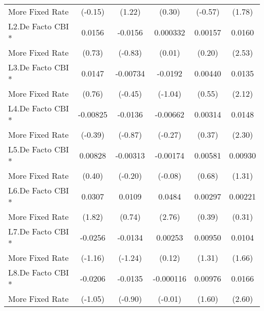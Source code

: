 {\begin{tabular}{l*{5}{c}}
More Fixed Rate     &     (-0.15)         &      (1.22)         &      (0.30)         &     (-0.57)         &      (1.78)         \\
[1em]
L2.De Facto CBI *   &      0.0156         &     -0.0156         &    0.000332         &     0.00157         &      0.0160\sym{*}  \\
More Fixed Rate     &      (0.73)         &     (-0.83)         &      (0.01)         &      (0.20)         &      (2.53)         \\
[1em]
L3.De Facto CBI *   &      0.0147         &    -0.00734         &     -0.0192         &     0.00440         &      0.0135\sym{*}  \\
More Fixed Rate     &      (0.76)         &     (-0.45)         &     (-1.04)         &      (0.55)         &      (2.12)         \\
[1em]
L4.De Facto CBI *   &    -0.00825         &     -0.0136         &    -0.00662         &     0.00314         &      0.0148\sym{*}  \\
More Fixed Rate     &     (-0.39)         &     (-0.87)         &     (-0.27)         &      (0.37)         &      (2.30)         \\
[1em]
L5.De Facto CBI *   &     0.00828         &    -0.00313         &    -0.00174         &     0.00581         &     0.00930         \\
More Fixed Rate     &      (0.40)         &     (-0.20)         &     (-0.08)         &      (0.68)         &      (1.31)         \\
[1em]
L6.De Facto CBI *   &      0.0307         &      0.0109         &      0.0484\sym{**} &     0.00297         &     0.00221         \\
More Fixed Rate     &      (1.82)         &      (0.74)         &      (2.76)         &      (0.39)         &      (0.31)         \\
[1em]
L7.De Facto CBI *   &     -0.0256         &     -0.0134         &     0.00253         &     0.00950         &      0.0104         \\
More Fixed Rate     &     (-1.16)         &     (-1.24)         &      (0.12)         &      (1.31)         &      (1.66)         \\
[1em]
L8.De Facto CBI *   &     -0.0206         &     -0.0135         &   -0.000116         &     0.00976         &      0.0166\sym{*}  \\
More Fixed Rate     &     (-1.05)         &     (-0.90)         &     (-0.01)         &      (1.60)         &      (2.60)         \\

\end{tabular}}
